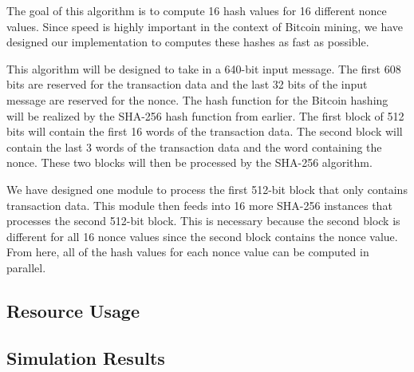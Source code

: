 \documentclass{article}
\begin{document}
The goal of this algorithm is to compute 16 hash values for 16 different nonce values. Since speed is highly important in the context of Bitcoin mining, we have designed our implementation to computes these hashes as fast as possible.

This algorithm will be designed to take in a 640-bit input message. The first 608 bits are reserved for the transaction data and the last 32 bits of the input message are reserved for the nonce. The hash function for the Bitcoin hashing will be realized by the SHA-256 hash function from earlier. The first block of 512 bits will contain the first 16 words of the transaction data. The second block will contain the last 3 words of the transaction data and the word containing the nonce. These two blocks will then be processed by the SHA-256 algorithm.

We have designed one module to process the first 512-bit block that only contains transaction data. This module then feeds into 16 more SHA-256 instances that processes the second 512-bit block. This is necessary because the second block is different for all 16 nonce values since the second block contains the nonce value. From here, all of the hash values for each nonce value can be computed in parallel.


\subsection{Resource Usage}


\subsection{Simulation Results}



\label{LastPage}
\end{document}
